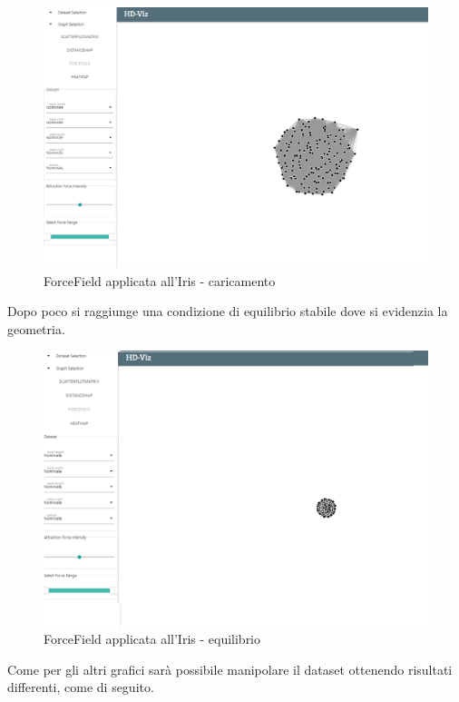 \documentclass[../manuale_utente.tex]{subfiles}
\begin{document}
\begin{figure}[H]
	\centering
	\includegraphics[width=18cm]{src/img/ff/ff_iris_0_1}
	\caption{ForceField applicata all'Iris - caricamento}
\end{figure}

Dopo poco si raggiunge una condizione di equilibrio stabile dove si evidenzia la geometria. 

\begin{figure}[H]
	\centering
	\includegraphics[width=18cm]{src/img/ff/ff_iris_0_2}
	\caption{ForceField applicata all'Iris - equilibrio}
\end{figure}


Come per gli altri grafici sarà possibile manipolare il dataset ottenendo risultati differenti, come di seguito. 
\end{document}

